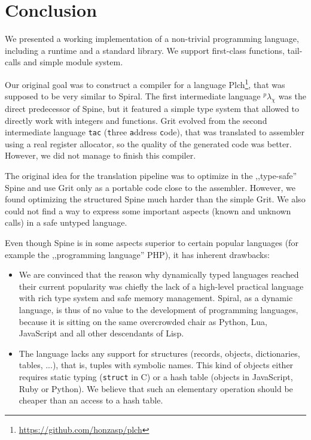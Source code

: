 \chapter{Conclusion}

We presented a working implementation of a non-trivial programming language,
including a runtime and a standard library. We support first-class functions,
tail-calls and simple module system.

Our original goal was to construct a compiler for a language
Plch\footnote{\url{https://github.com/honzasp/plch}}, that was supposed to be
very similar to Spiral. The first intermediate language $^p\lambda_\chi$ was the
direct predecessor of Spine, but it featured a simple type system that allowed
to directly work with integers and functions. Grit evolved from the second
intermediate language \texttt{tac} (\texttt{t}hree \texttt{a}ddress
\texttt{c}ode), that was translated to assembler using a real register
allocator, so the quality of the generated code was better. However, we did not
manage to finish this compiler.

The original idea for the translation pipeline was to optimize in the
,,type-safe'' Spine and use Grit only as a portable code close to the assembler.
However, we found optimizing the structured Spine much harder than the simple
Grit. We also could not find a way to express some important aspects (known and
unknown calls) in a safe untyped language.

Even though Spine is in some aspects superior to certain popular languages (for
example the ,,programming language'' PHP), it has inherent drawbacks:

\begin{itemize}
  \item We are convinced that the reason why dynamically typed languages reached
    their current popularity was chiefly the lack of a high-level practical
    language with rich type system and safe memory management. Spiral, as a
    dynamic language, is thus of no value to the development of programming
    languages, because it is sitting on the same overcrowded chair as Python,
    Lua, JavaScript and all other descendants of Lisp.

  \item The language lacks any support for structures (records, objects,
    dictionaries, tables, ...), that is, tuples with symbolic names. This kind
    of objects either requires static typing (\texttt{struct} in C) or a hash
    table (objects in JavaScript, Ruby or Python). We believe that such an
    elementary operation should be cheaper than an access to a hash table.
\end{itemize}


